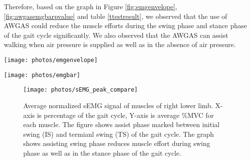 \documentclass[paper,JRM,paper]{jaciiiarticle}
\begin{document}
Therefore, based on the graph in Figure \ref{fig:emgenvelope}, \ref{fig:awgasemgbarpvalue} and table \ref{ttestresult}, we observed that the use of AWGAS could reduce the muscle efforts during the swing phase and stance phase of the gait cycle significantly. We also observed that the AWGAS can assist walking when air pressure is supplied as well as in the absence of air pressure. 



\begin{figure*}
	\centering
	\texttt{[image: photos/emgenvelope]}
	\caption{Changes in the msuclemuscle activation pattern of the gait cycle due to the use of AWGAS with standard deviation. The X-axis signifies the gait cycle from 0 to 100 \% and the Y-axis signifies the average \%MVC sEMG activation pattern for each muscle under observation}
	\label{fig:emgenvelope}
\end{figure*}
\begin{figure*}
	\centering
	\texttt{[image: photos/emgbar]}
	\caption{Statistical evaluation of AWGAS based on the average of \% MVC for all subjectparticipants. X-axis is for all the muscles under observation and Y-axis is the average \% MVC for all subjectparticipants}
	\label{fig:awgasemgbarpvalue}
\end{figure*}
\begin{figure}
	\centering
	\texttt{[image: photos/sEMG\_peak\_compare]}
	\caption{Average normalized sEMG signal of muscles of right lower limb. X-axis is percentage of the gait cycle, Y-axis is average \%MVC for each muscle. The figure shows assist phase marked between initial swing (IS) and termianl swing (TS) of the gait cycle. The graph shows assisting swing phase reduces muscle effort during swing phase as well as in the stance phase of the gait cycle.}
	\label{fig:semgpeakcompare}
\end{figure}
\end{document}
